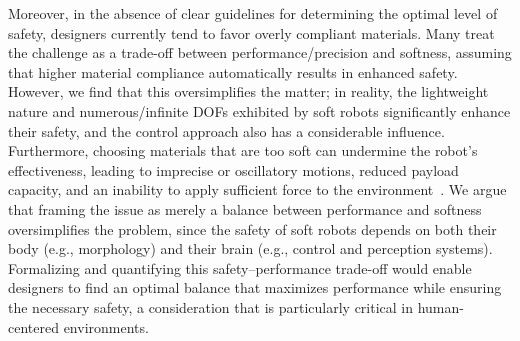 Moreover, in the absence of clear guidelines for determining the optimal level of safety, designers currently tend to favor overly compliant materials. Many treat the challenge as a trade-off between performance/precision and softness, assuming that higher material compliance automatically results in enhanced safety. 
However, we find that this oversimplifies the matter; in reality, the lightweight nature and numerous/infinite \glspl{DOF} exhibited by soft robots significantly enhance their safety, and the control approach also has a considerable influence.
Furthermore, choosing materials that are too soft can undermine the robot’s effectiveness, leading to imprecise or oscillatory motions, reduced payload capacity, and an inability to apply sufficient force to the environment~\citep{iida2011soft, cianchetti2013stiff, mazzolai2022roadmap, majidi2014soft, hawkes2017soft}. We argue that framing the issue as merely a balance between performance and softness oversimplifies the problem, since the safety of soft robots depends on both their body (e.g., morphology) and their brain (e.g., control and perception systems). Formalizing and quantifying this safety–performance trade-off would enable designers to find an optimal balance that maximizes performance while ensuring the necessary safety, a consideration that is particularly critical in human-centered environments.

